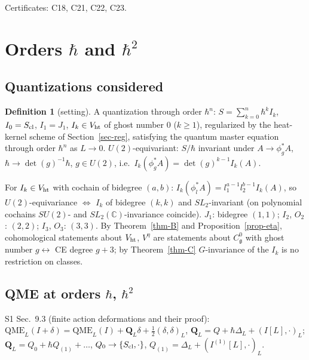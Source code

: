 \documentclass[10pt,a4paper]{article}
\numberwithin{equation}{section}
\theoremstyle{definition}
\newtheorem{definition}[theorem]{Definition}
\theoremstyle{remark}
\newcommand{\g}{\mathfrak g}
\newcommand{\Vht}{V_{\rm ht}}
\newcommand{\Veta}{V^{\eta}}
\newcommand{\Cg}{C^0_{\g}}
\newcommand{\cert}[1]{\par\noindent\textup{Certificates: #1.}\par}
\begin{document}
\cert{C18, C21, C22, C23}

\section{\texorpdfstring{Orders $\hbar$ and $\hbar^2$}{Orders hbar and hbar2}}\label{sec-deform}

\subsection{Quantizations considered}

\begin{definition}[setting]\label{def-setting}
A quantization through order $\hbar^n$: $S=\sum_{k=0}^n\hbar^kI_k$, $I_0=S_{\rm cl}$, $I_1=J_1$, $I_k\in\Vht$ of ghost number $0$ ($k\ge1$), regularized by the heat-kernel scheme of Section~\ref{sec-reg}, satisfying the quantum master equation through order $\hbar^n$ as $L\to0$. $U(2)$-equivariant: $S/\hbar$ invariant under $A\to\phi_g^*A$, $\hbar\to\det(g)^{-1}\hbar$, $g\in U(2)$, i.e.\ $I_k(\phi_g^*A)=\det(g)^{k-1}I_k(A)$.
\end{definition}
For $I_k\in\Vht$ with cochain of bidegree $(a,b)$: $I_k(\phi_l^*A)=l_1^{a-1}l_2^{b-1}I_k(A)$, so $U(2)$-equivariance $\iff$ $I_k$ of bidegree $(k,k)$ and $SL_2$-invariant (on polynomial cochains $SU(2)$- and $SL_2(\mathbb C)$-invariance coincide). $J_1$: bidegree $(1,1)$; $I_2$, $O_2$: $(2,2)$; $I_3$, $O_3$: $(3,3)$. By Theorem~\ref{thm-B} and Proposition~\ref{prop-eta}, cohomological statements about $\Vht$, $\Veta$ are statements about $\Cg$ with ghost number $g\leftrightarrow$ CE degree $g+3$; by Theorem~\ref{thm-C} $G$-invariance of the $I_k$ is no restriction on classes.

\subsection{\texorpdfstring{QME at orders $\hbar$, $\hbar^2$}{QME at orders hbar, hbar2}}\label{sec-qme}

S1 Sec.~9.3 (finite action deformations and their proof): $\mathrm{QME}_L(I+\delta)=\mathrm{QME}_L(I)+\mathbf Q_L\delta+\frac12(\delta,\delta)_L$, $\mathbf Q_L=Q+\hbar\Delta_L+(I[L],\cdot)_L$; $\mathbf Q_L=Q_0+\hbar Q_{(1)}+\dots$, $Q_0\to\{S_{\rm cl},\cdot\}$, $Q_{(1)}=\Delta_L+(I^{(1)}[L],\cdot)_L$.
\end{document}
